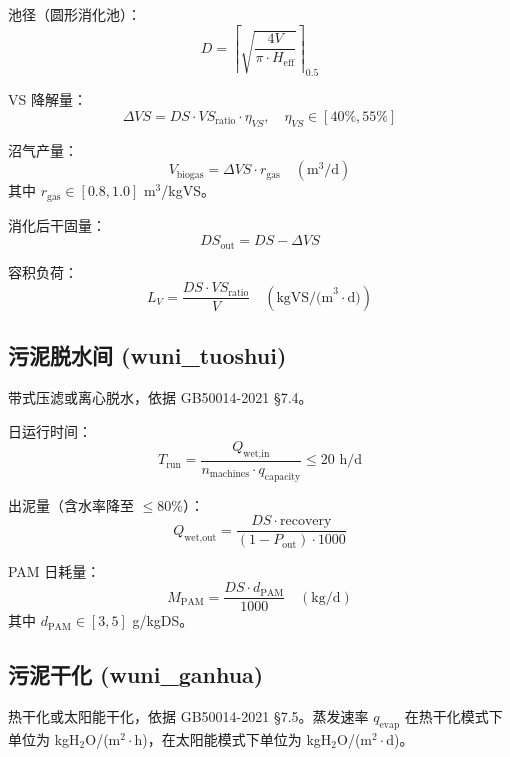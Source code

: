 \documentclass[12pt,a4paper]{ctexart}
\begin{document}
池径（圆形消化池）：
\begin{equation}
D = \left\lceil \sqrt{\frac{4V}{\pi \cdot H_{\text{eff}}}} \right\rceil_{0.5}
\end{equation}

VS 降解量：
\begin{equation}
\Delta VS = DS \cdot VS_{\text{ratio}} \cdot \eta_{VS}, \quad \eta_{VS} \in [40\%, 55\%]
\end{equation}

沼气产量：
\begin{equation}
V_{\text{biogas}} = \Delta VS \cdot r_{\text{gas}} \quad (\text{m}^3/\text{d})
\end{equation}
其中 $r_{\text{gas}} \in [0.8, 1.0]$ m$^3$/kgVS。

消化后干固量：
\begin{equation}
DS_{\text{out}} = DS - \Delta VS
\end{equation}

容积负荷：
\begin{equation}
L_V = \frac{DS \cdot VS_{\text{ratio}}}{V} \quad (\text{kgVS/(m}^3\cdot\text{d)})
\end{equation}

\subsection{污泥脱水间 (wuni\_tuoshui)}
带式压滤或离心脱水，依据 GB50014-2021 §7.4。

日运行时间：
\begin{equation}
T_{\text{run}} = \frac{Q_{\text{wet,in}}}{n_{\text{machines}} \cdot q_{\text{capacity}}} \le 20 \text{ h/d}
\end{equation}

出泥量（含水率降至 $\le 80\%$）：
\begin{equation}
Q_{\text{wet,out}} = \frac{DS \cdot \text{recovery}}{(1 - P_{\text{out}}) \cdot 1000}
\end{equation}

PAM 日耗量：
\begin{equation}
M_{\text{PAM}} = \frac{DS \cdot d_{\text{PAM}}}{1000} \quad (\text{kg/d})
\end{equation}
其中 $d_{\text{PAM}} \in [3, 5]$ g/kgDS。

\subsection{污泥干化 (wuni\_ganhua)}
热干化或太阳能干化，依据 GB50014-2021 §7.5。蒸发速率 $q_{\text{evap}}$ 在热干化模式下单位为 kgH$_2$O/(m$^2\cdot$h)，在太阳能模式下单位为 kgH$_2$O/(m$^2\cdot$d)。
\end{document}
